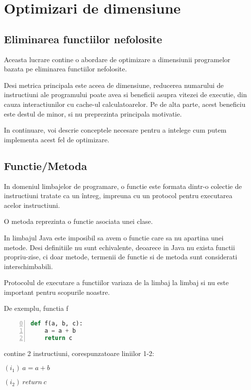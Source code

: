 \chapter{Optimizari de dimensiune}\label{capitolul_optimizari_de_dimensiune}

\section{Eliminarea functiilor nefolosite}

Aceasta lucrare contine o abordare de optimizare a dimensiunii
programelor bazata pe eliminarea functiilor nefolosite.

Desi metrica principala este aceea de dimensiune, reducerea
numarului de instructiuni ale programului poate avea si beneficii
asupra vitezei de executie, din cauza interactiunilor cu cache-ul
calculatoarelor. Pe de alta parte, acest beneficiu este destul de
minor, si nu preprezinta principala motivatie.

In continuare, voi descrie conceptele necesare pentru a intelege
cum putem implementa acest fel de optimizare.

\section{Functie/Metoda}

In domeniul limbajelor de programare, o functie  este
formata dintr-o colectie de instructiuni tratate ca un întreg,
impreuna cu un protocol pentru executarea acelor instructiuni.

O metoda  reprezinta o functie asociata unei clase.

In limbajul Java este imposibil sa avem o functie care sa nu
apartina unei metode.
Desi definitiile nu sunt echivalente, deoarece in Java nu exista
functii propriu-zise, ci doar metode, termenii de functie si de metoda
sunt considerati interschimbabili.

Protocolul de executare a functiilor variaza de la limbaj la
limbaj si nu este important pentru scopurile noastre.

De exemplu, functia f
\begin{lstlisting}[language=Python, numbers=left, firstnumber=0]
def f(a, b, c):
    a = a + b
    return c
\end{lstlisting}
contine 2 instructiuni, corespunzatoare liniilor 1-2:

$(i_1)\ a = a + b$

$(i_2)\ return\ c$

